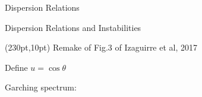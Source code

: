 \begin{frame}{Dispersion Relations}

\end{frame}

\begin{frame}{Dispersion Relations and Instabilities}


       \begin{textblock*}{100pt}(230pt,10pt)
           Remake of Fig.3 of Izaguirre et al, 2017
       \end{textblock*}

Define $u=\cos\theta$

Garching spectrum:


\end{frame}
